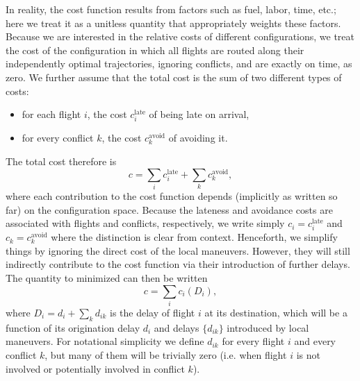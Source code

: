 \documentclass{article}
\begin{document}
In reality, the cost function results from factors such as fuel, labor, time, etc.; here we treat it as a unitless quantity that appropriately weights these factors.
Because we are interested in the relative costs of different configurations, we treat the cost of the configuration in which all flights are routed along their independently optimal trajectories, ignoring conflicts, and are exactly on time, as zero.
We further assume that the total cost is the sum of two different types of costs:
\begin{itemize}
  \item for each flight $i$, the cost $c_i^{\mathrm{late}}$ of being late on arrival,
  \item for every conflict $k$, the cost $c_k^{\mathrm{avoid}}$ of avoiding it.
\end{itemize}
The total cost therefore is 
\begin{equation*}
c = 
\sum_i c^{\mathrm{late}}_i + 
\sum_{k} c^{\mathrm{avoid}}_k
,
\end{equation*}
where each contribution to the cost function depends (implicitly as written so far) on the configuration space.
Because the lateness and avoidance costs are associated with flights and conflicts, respectively, we write simply $c_i = c_i^{\mathrm{late}}$ and $c_{k} = c_{k}^{\mathrm{avoid}}$ where the distinction is clear from context.
Henceforth, we simplify things by ignoring the direct cost of the local maneuvers. 
However, they will still indirectly contribute to the cost function via their introduction of further delays.
The quantity to minimized can then be written
\begin{equation*}
c = 
\sum_i c_i (D_i),
\end{equation*}
where $D_i = d_i + \sum_k d_{ik}$ is the delay of flight $i$ at its destination, which will be a function of its origination delay $d_i$ and delays $\{d_{ik}\}$ introduced by local maneuvers.
For notational simplicity we define $d_{ik}$ for every flight $i$ and every conflict $k$, but many of them will be trivially zero (i.e. when flight $i$ is not involved or potentially involved in conflict $k$).
\end{document}
